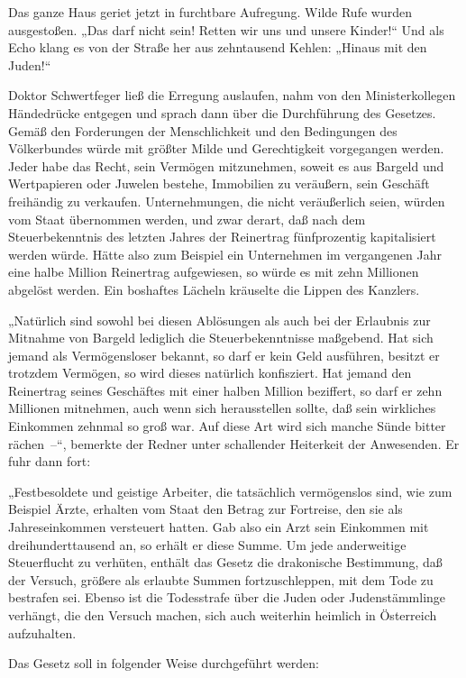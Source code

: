Das ganze Haus geriet jetzt in furchtbare Aufregung. Wilde Rufe
wurden ausgestoßen. „Das darf nicht sein! Retten wir uns und unsere
Kinder!“ Und als Echo klang es von der Straße her aus zehntausend
Kehlen: „Hinaus mit den Juden!“

Doktor Schwertfeger ließ die Erregung auslaufen, nahm von den
Ministerkollegen Händedrücke entgegen und sprach dann über die
Durchführung des Gesetzes.  Gemäß den Forderungen
der Menschlichkeit und den Bedingungen des Völkerbundes würde mit
größter Milde und Gerechtigkeit vorgegangen werden. Jeder habe das
Recht, sein Vermögen mitzunehmen, soweit es aus Bargeld und
Wertpapieren oder Juwelen bestehe, Immobilien zu veräußern, sein
Geschäft freihändig zu verkaufen. Unternehmungen, die nicht
veräußerlich seien, würden vom Staat übernommen werden, und zwar
derart, daß nach dem Steuerbekenntnis des letzten Jahres der
Reinertrag fünfprozentig kapitalisiert werden würde. Hätte also zum
Beispiel ein Unternehmen im vergangenen Jahr eine halbe Million
Reinertrag aufgewiesen, so würde es mit zehn Millionen abgelöst
werden. Ein boshaftes Lächeln kräuselte die Lippen des Kanzlers.

„Natürlich sind sowohl bei diesen Ablösungen als auch bei der
Erlaubnis zur Mitnahme von Bargeld lediglich die Steuerbekenntnisse
maßgebend. Hat sich jemand als Vermögensloser bekannt, so darf er
kein Geld ausführen, besitzt er trotzdem Vermögen, so wird dieses
natürlich konfisziert. Hat jemand den Reinertrag seines Geschäftes
mit einer halben Million beziffert, so darf er zehn Millionen
mitnehmen, auch wenn sich herausstellen sollte, daß sein wirkliches
Einkommen zehnmal so groß war. Auf diese Art wird sich manche Sünde
bitter rächen~–“, bemerkte der Redner unter schallender Heiterkeit
der Anwesenden. Er fuhr dann fort:

„Festbesoldete und geistige Arbeiter, die tatsächlich vermögenslos
sind, wie zum Beispiel Ärzte, erhalten vom Staat den Betrag zur
Fortreise, den sie als Jahreseinkommen  versteuert
hatten. Gab also ein Arzt sein Einkommen mit dreihunderttausend an,
so erhält er diese Summe. Um jede anderweitige Steuerflucht zu
verhüten, enthält das Gesetz die drakonische Bestimmung, daß der
Versuch, größere als erlaubte Summen fortzuschleppen, mit dem Tode
zu bestrafen sei. Ebenso ist die Todesstrafe über die Juden oder
Judenstämmlinge verhängt, die den Versuch machen, sich auch
weiterhin heimlich in Österreich aufzuhalten.

Das Gesetz soll in folgender Weise durchgeführt werden:

